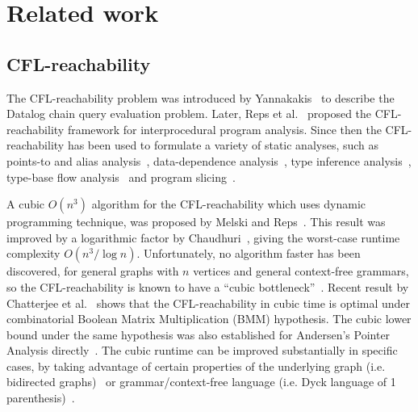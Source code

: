 \section{Related work}
\label{sec:related}
\subsection{CFL-reachability}
The CFL-reachability problem was introduced by Yannakakis~\cite{Yannakakis} to describe the Datalog chain query evaluation problem. Later, Reps et al.~\cite{10.1145/222124.222146, 10.5555/271338.271343, SAGIV1996131} proposed the CFL-reachability framework for interprocedural program analysis. Since then the CFL-reachability has been used to formulate a variety of static analyses, such as points-to and alias analysis~\cite{ 10.1145/3158118, 10.1145/2814270.2814307,  10.1145/3450492, 10.1145/3360574, 10.1007/978-3-642-37051-9_4, 10.1145/2351676.2351720, 10.1145/1103845.1094817, 10.1145/2491956.2462159, 10.1145/2660193.2660213, Zheng:2008:DAA:1328897.1328464}, data-dependence analysis~\cite{10.1145/3158118}, type inference analysis~\cite{10.1145/2647508.2647522}, type-base flow analysis~\cite{10.1145/360204.360208} and program slicing~\cite{10.1145/193173.195287}.

A cubic $O(n^3)$ algorithm for the CFL-reachability which uses dynamic programming technique, was proposed by Melski and Reps~\cite{10.1145/258994.259006}. This result was improved by a logarithmic factor by Chaudhuri~\cite{Chaudhuri2008SubcubicAF}, giving the worst-case runtime complexity $O(n^3/\log n)$. Unfortunately, no algorithm faster has been discovered, for general graphs with $n$ vertices and general context-free grammars, so the CFL-reachability is known to have a ``cubic bottleneck''~\cite{10.5555/788019.788876}. Recent result by Chatterjee et al.~\cite{10.1145/3158118} shows that the CFL-reachability in cubic time is optimal under combinatorial Boolean Matrix Multiplication (BMM) hypothesis. The cubic lower bound under the same hypothesis was also established for Andersen's Pointer Analysis directly~\cite{pavlogiannis2020finegrained}. The cubic runtime can be improved substantially in specific cases, by taking advantage of certain properties of the underlying graph (i.e. bidirected graphs)~\cite{10.1145/3158118, 10.1145/2491956.2462159} or grammar/context-free language (i.e. Dyck language of 1 parenthesis)~\cite{8249039, pavlogiannis2020finegrained}.

